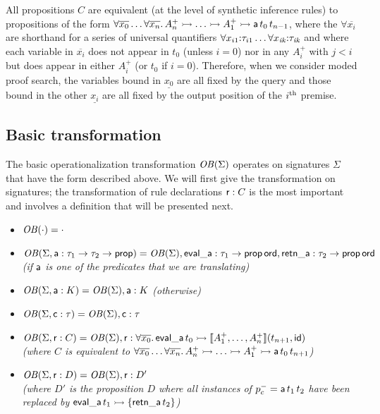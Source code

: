 All propositions $C$ are equivalent (at the level of synthetic
inference rules) to propositions of the form $\forall
\overline{x_0}\ldots \forall \overline{x_n}.\,A^+_n \rightarrowtail \ldots
\rightarrowtail A^+_1 \rightarrowtail {\sf a}\,t_{0}\,t_{n-1}$,
where the $\forall \overline{x_i}$ are shorthand for a series of
universal quantifiers $\forall {x_{i1}}{:}{\tau_{i1}} \ldots \forall
{x_{\it ik}}{:}{\tau_{\it ik}}$ and where each variable in
$\overline{x_i}$ does not appear in $t_0$ (unless $i = 0$)
nor in any $A^+_i$ with $j < i$ but does appear in either $A^+_i$ (or
$t_0$ if $i = 0$). Therefore, when we consider moded proof
search, the variables bound in $\underline{x_0}$ are all fixed by the
query and those bound in the other $\underline{x_i}$ are all fixed by
the output position of the $i^{\rm th}$ premise.

\subsection{Basic transformation}
\label{sec:trans-basic}

The basic operationalization transformation ${\it OB}({\Sigma})$
operates on signatures $\Sigma$ that have the form described above. We
will first give the transformation on signatures; the transformation
of rule declarations ${\sf r} : C$ is the most important and involves
a definition that will be presented next.

\begin{itemize}
\item ${\it OB}({\cdot}) = \cdot$
\item ${\it OB}({\Sigma, {\sf a} : \tau_1 \rightarrow \tau_2
    \rightarrow {\sf prop}}) = {\it OB}({\Sigma}), {\sf eval\_a} :
  \tau_1 \rightarrow {\sf prop\,ord}, {\sf retn\_a} : \tau_2
  \rightarrow {\sf prop\,ord}$ \\ {\it (if $\sf a$ is one of the
    predicates that we are translating)}
\item ${\it OB}({\Sigma, {\sf a} : K}) = {\it OB}({\Sigma}), {\sf a}
  : K$ {\it (otherwise)}
\item ${\it OB}({\Sigma, {\sf c} : \tau}) = {\it OB}({\Sigma}), {\sf
    c} : \tau$ 
\item ${\it OB}({\Sigma, {\sf r} : C}) = {\it OB}({\Sigma}), {\sf r}
  : \forall \overline{x_0}.\, {\sf eval\_a}\,t_0 \rightarrowtail \llbracket A^+_1,
  \ldots, A^+_n \rrbracket (t_{n+1}, {\sf id})$ \\ {\it (where $C$ is
    equivalent to $\forall \overline{x_0}\ldots \forall
    \overline{x_n}.\, A^+_n \rightarrowtail \ldots \rightarrowtail A^+_1 \rightarrowtail {\sf
      a}\,t_{0}\,t_{n+1}$)}
\item ${\it OB}({\Sigma, {\sf r} : D}) = {\it OB}({\Sigma}), {\sf r}
  : D'$\\{\it (where $D'$ is the proposition $D$ where all instances of
  $p^-_c = {\sf a}\,t_1\,t_2$ have been replaced by ${\sf
    eval\_a}\,t_1 \rightarrowtail \{ {\sf retn\_a}\,t_2 \}$)}
\end{itemize}


